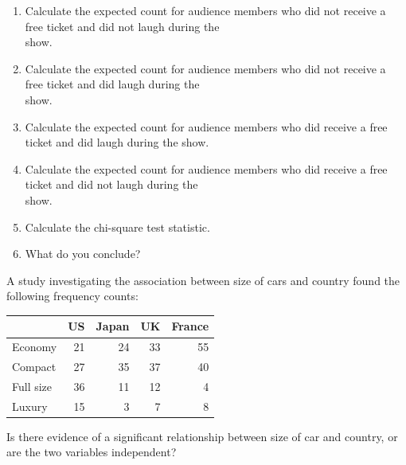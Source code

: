 \documentclass[11pt, chapterprefix=true]{scrbook}\usepackage[]{graphicx}\usepackage[]{color}
\begin{document}
\begin{exercises}
\begin{exercise}
\begin{enumerate}
  \item Calculate the expected count for audience members who did not receive a \\ free ticket and did not laugh during the \\ show.
  \item Calculate the expected count for audience members who did not receive a \\ free ticket and did laugh during the \\ show.
  \item Calculate the expected count for audience members who did receive a free \\ ticket and did laugh during the show.
  \item Calculate the expected count for audience members who did receive a free \\ ticket and did not laugh during the \\ show.
  \item Calculate the chi-square test statistic.
  \item What do you conclude?
\end{enumerate}

\end{exercise}
\begin{solution}  %

\end{solution}

\begin{exercise} %

A study investigating the association between size of cars and country found the following frequency counts:

\begin{table}[ht]
\centering 
\begin{tabular}{@{} lrrrr @{}} \hline
         & US & Japan & UK & France \\ \hline
Economy & 21 & 24 & 33 & 55 \\
Compact & 27 & 35 & 37 & 40 \\
Full size & 36 & 11 & 12 & 4 \\
Luxury  & 15 & 3 & 7 & 8 \\ \hline
\end{tabular}
\end{table}

Is there evidence of a significant relationship between size of car and country, or are the two variables independent?
\end{exercise}
\begin{solution} %


\end{solution}
\end{exercises}
\end{document}
